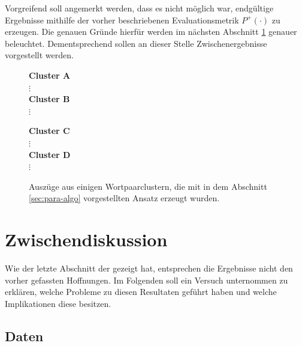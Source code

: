 Vorgreifend soll angemerkt werden, dass es nicht möglich war, endgültige Ergebnisse mithilfe der vorher beschriebenen
Evaluationsmetrik $P^+(\cdot)$ zu erzeugen. Die genauen Gründe hierfür werden im nächsten Abschnitt \ref{sec:zwi-dis}
genauer beleuchtet. Dementsprechend sollen an dieser Stelle Zwischenergebnisse vorgestellt werden.\\

\begin{figure}[h]
  \centering
  \begin{multicols}{2}
    \textbf{Cluster A}\\
    $\vdots$\\
    \columnbreak
    \textbf{Cluster B}\\
    $\vdots$\\
  \end{multicols}
  \begin{multicols}{2}
    \textbf{Cluster C}\\
    $\vdots$\\
    \columnbreak
    \textbf{Cluster D}\\
    $\vdots$\\
  \end{multicols}
  \caption[Auszug aus verschiedenen Wortpaarclustern]{Auszüge aus einigen Wortpaarclustern, die mit in dem Abschnitt
  \ref{sec:para-algo} vorgestellten Ansatz erzeugt wurden.}
\end{figure}

\section{Zwischendiskussion}\label{sec:zwi-dis}

Wie der letzte Abschnitt der gezeigt hat, entsprechen die Ergebnisse nicht den vorher gefassten Hoffnungen.
Im Folgenden soll ein Versuch unternommen zu erklären, welche Probleme zu diesen Resultaten geführt haben und welche
Implikationen diese besitzen.

\subsection{Daten}\label{sec:zwi-dis-data}

